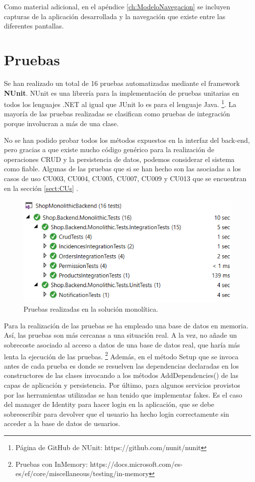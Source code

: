 \documentclass[11pt,spanish,listoffigures]{tfgetsinf}
\begin{document}
\begin{itemize}
\end{itemize}

Como material adicional, en el apéndice \ref{ch:ModeloNavegacion}  se incluyen capturas de la aplicación desarrollada y la navegación que existe entre las diferentes pantallas.

\section{Pruebas} \label{sect:MonoPruebas}

Se han realizado un total de 16 pruebas automatizadas mediante el framework \textbf{NUnit}. NUnit es una librería para la implementación de pruebas unitarias en todos los lenguajes .NET al igual que JUnit lo es para el lenguaje Java. \footnote{ Página de GitHub de NUnit: https://github.com/nunit/nunit}. La mayoría de las pruebas realizadas se clasifican como pruebas de integración porque involucran a más de una clase. 

No se han podido probar todos los métodos expuestos en la interfaz del back-end, pero gracias a que existe mucho código genérico para la realización de operaciones CRUD y la persistencia de datos, podemos considerar el sistema como fiable. Algunas de las pruebas que si se han hecho son las asociadas a los casos de uso CU003, CU004, CU005, CU007, CU009 y CU013 que se encuentran en la sección \ref{sect:CUs} .

\begin{figure}[h]
\centering
\includegraphics[scale=0.8]{Tests}
\caption{Pruebas realizadas en la solución monolítica.}
\end{figure}

Para la realización de las pruebas se ha empleado una base de datos en memoria. Así, las pruebas son más cercanas a una situación real. A la vez, no añade un sobrecoste asociado al acceso a datos de una base de datos real, que haría más lenta la ejecución de las pruebas. \footnote{ Pruebas con InMemory: https://docs.microsoft.com/es-es/ef/core/miscellaneous/testing/in-memory} Además, en el método Setup que se invoca antes de cada prueba es donde se resuelven las dependencias declaradas en los constructores de las clases invocando a los métodos AddDependencies() de las capas de aplicación y persistencia. Por último, para algunos servicios provistos por las herramientas utilizadas se han tenido que implementar fakes. Es el caso del manager de Identity para hacer login en la aplicación, que se debe sobreescribir para devolver que el usuario ha hecho login correctamente sin acceder a la base de datos de usuarios.
\end{document}
